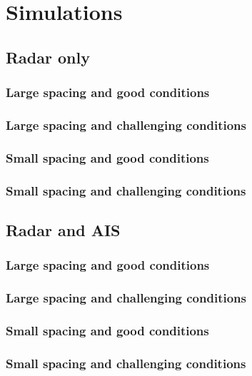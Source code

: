 
\chapter{Simulations}\label{chapter:simulations}
\section{Radar only}
\subsection{Large spacing and good conditions}

\subsection{Large spacing and challenging conditions}

\subsection{Small spacing and good conditions}

\subsection{Small spacing and challenging conditions}

\section{Radar and AIS}
\subsection{Large spacing and good conditions}

\subsection{Large spacing and challenging conditions}

\subsection{Small spacing and good conditions}

\subsection{Small spacing and challenging conditions}